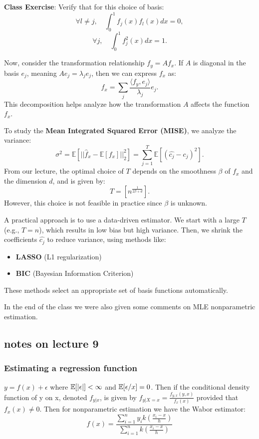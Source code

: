 \documentclass{article}
\begin{document}
\textbf{Class Exercise}: Verify that for this choice of basis:
\[
\forall l \neq j, \quad \int_{0}^{1} f_j(x) f_l(x) dx = 0,
\]
\[
\forall j, \quad \int_{0}^{1} f_j^2(x) dx = 1.
\]

Now, consider the transformation relationship \( f_y = A f_x \). If \( A \) is diagonal in the basis \( e_j \), meaning \( A e_j = \lambda_j e_j \), then we can express \( f_x \) as:
\[
f_x = \sum_j \frac{\langle f_y, e_j \rangle}{\lambda_j} e_j.
\]
This decomposition helps analyze how the transformation \( A \) affects the function \( f_x \).

To study the \textbf{Mean Integrated Squared Error (MISE)}, we analyze the variance:
\[
\sigma^2 = \mathbb{E} \left[ ||\hat{f}_x - \mathbb{E}[f_x]||^2_2 \right] = \sum_{j=1}^{T} \mathbb{E} \left[ (\hat{c_j} - c_j)^2 \right].
\]
From our lecture, the optimal choice of \( T \) depends on the smoothness \( \beta \) of \( f_x \) and the dimension \( d \), and is given by:
\[
T = \left[ n^{\frac{1}{2\beta + d}} \right].
\]
However, this choice is not feasible in practice since \( \beta \) is unknown.

\begin{remark}
    A practical approach is to use a data-driven estimator. We start with a large \( T \) (e.g., \( T = n \)), which results in low bias but high variance. Then, we shrink the coefficients \( \hat{c_j} \) to reduce variance, using methods like:
    \begin{itemize}
        \item \textbf{LASSO} (L1 regularization)
        \item \textbf{BIC} (Bayesian Information Criterion)
    \end{itemize}
    These methods select an appropriate set of basis functions automatically.
\end{remark}



In the end of the class we were also given some comments on MLE nonparametric estimation. 


\subsection{notes on lecture 9}

\subsubsection{Estimating a regression function}
\(y=f(x)+ \epsilon\) where \(\mathbb{E}[|\epsilon|]<\infty\) and \(\mathbb{E}[\epsilon/x]=0\). Then if the conditional density function of y on x, denoted \(f_{y|x}\), is given by \(f_{y|X=x}=\frac{f_{y,x}(y,x)}{f_{x}(x)}\) provided that \(f_{x}(x)\neq 0\). Then for nonparametric estimation we have the Wabor estimator: \[f(x)=\frac{\sum_{i=1}^{n}y_{i}k\left(\frac{x_i-x}{h}\right)}{\sum_{i=1}^{n}k\left(\frac{x_i-x}{h}\right)}\]
\end{document}

